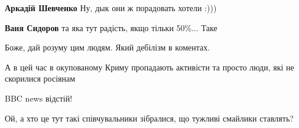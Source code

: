 \begin{itemize}
\begin{itemize}
\textbf{Аркадій Шевченко} Ну, дык они ж порадовать хотели :)))

\begin{itemize}
 
\textbf{Ваня Сидоров} та яка тут радість, якщо тільки 50\%... Таке
\end{itemize}

\end{itemize}

 
Боже, дай розуму цим людям. Який дебілізм в коментах.

 
А в цей час в окупованому Криму пропадають активісти та просто люди, які не скорилися росіянам

 
BBC news відстій!

 
Ой, а хто це тут такі співчувальники зібралися, що тужливі смайлики ставлять?

 


\end{itemize}
